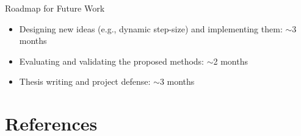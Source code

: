 \documentclass[11pt,aspectratio=169]{beamer}
\begin{document}
\begin{frame}{Roadmap for Future Work}
  \begin{itemize}
    \item Designing new ideas (e.g., dynamic step-size) and implementing them: $\sim$3 months
    \vskip 0.2cm
    \item Evaluating and validating the proposed methods: $\sim$2 months
    \vskip 0.2cm
    \item Thesis writing and project defense: $\sim$3 months
  \end{itemize}
\end{frame}

\section{References}
\end{document}
